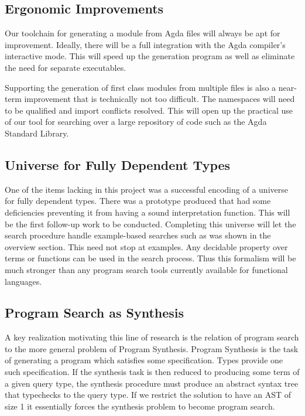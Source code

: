 \documentclass[acmsmall,review,authorversion]{acmart}
\newcommand{\?}{\stackrel{?}{\approx}}
\begin{document}
\subsection{Ergonomic Improvements}

Our toolchain for generating a module from Agda files will always be apt for
improvement. Ideally, there will be a full integration with the Agda compiler's
interactive mode. This will speed up the generation program as well as eliminate
the need for separate executables.

Supporting the generation of first class modules from multiple files is also a
near-term improvement that is technically not too difficult. The namespaces
will need to be qualified and import conflicts resolved. This will open up the
practical use of our tool for searching over a large repository of code such as
the Agda Standard Library\cite{bove2009brief}.


\subsection{Universe for Fully Dependent Types}

One of the items lacking in this project was a successful encoding of a universe
for fully dependent types. There was a prototype produced that had some
deficiencies preventing it from having a sound interpretation function. This
will be the first follow-up work to be conducted. Completing this universe will
let the search procedure handle example-based searches such as was shown in the
overview section. This need not stop at examples. Any decidable property over
terms or functions can be used in the search process. Thus this formalism will
be much stronger than any program search tools currently available for
functional languages.

\subsection{Program Search as Synthesis}

A key realization motivating this line of research is the relation of program
search to the more general problem of Program Synthesis. Program Synthesis is
the task of generating a program which satisfies some specification. Types
provide one such specification. If the synthesis task is then reduced to
producing some term of a given query type, the synthesis procedure must produce
an abstract syntax tree that typechecks to the query type. If we restrict the
solution to have an AST of size 1 it essentially forces the synthesis problem to
become program search.
\end{document}
